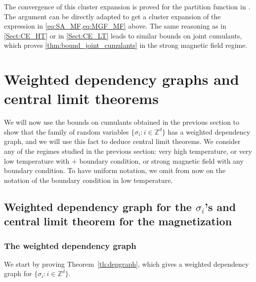 \documentclass{amsart}
\newcommand{\field}[1]{\mathbb{#1}}
\newcommand{\Z}{\field{Z}}
\numberwithin{equation}{section}
\theoremstyle{remark}
\begin{document}
The convergence of this cluster expansion is proved for the partition function in \cite[Section 5.7]{Velenik}.
The argument can be directly adapted to get a cluster expansion of the expression in \cref{eq:SA_MF,eq:MGF_MF} above.
The same reasoning as in \cref{Sect:CE_HT} or in \cref{Sect:CE_LT} leads
to similar bounds on joint cumulants,
which proves \cref{thm:bound_joint_cumulants} in the strong magnetic field regime.


\section{Weighted dependency graphs and central limit theorems}
\label{sec:clt}
We will now use the bounds on cumulants obtained in the previous section to show that the family of random variables $\{\sigma_i : i \in \Z^d \}$ has a weighted dependency graph, and we will use this fact to deduce central limit theorems. We consider any of the regimes studied in the previous section:
very high temperature, or very low temperature with $+$ boundary condition, or strong magnetic field with any boundary condition.
To have uniform notation, we omit from now on the notation of the boundary condition in low temperature.




\subsection{Weighted dependency graph for the $\sigma_i$'s and central limit theorem for the magnetization}
\subsubsection{The weighted dependency graph}
\label{Sect:WDG_Spins}
We start by proving Theorem~\ref{th:depgraph}, which gives a weighted dependency graph for  $\{\sigma_i : i \in \Z^d \}$.
\end{document}
